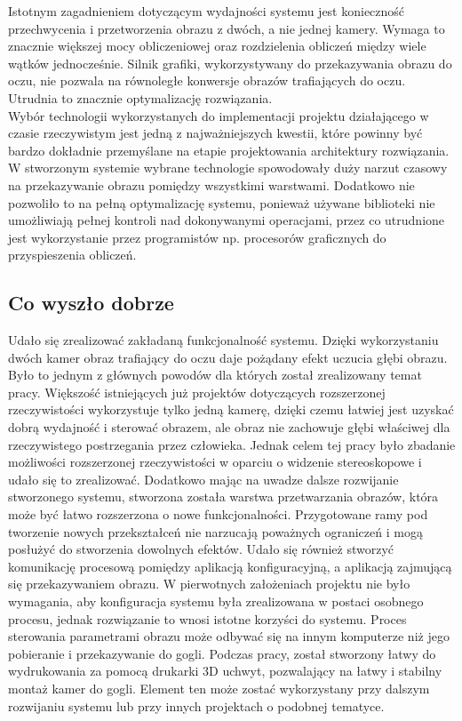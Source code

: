 \documentclass[a4paper,11pt,twoside]{report}
\theoremstyle{definition}
\begin{document}
Istotnym zagadnieniem dotyczącym wydajności systemu jest konieczność przechwycenia i przetworzenia obrazu z dwóch, a nie jednej kamery. Wymaga to znacznie większej mocy obliczeniowej oraz rozdzielenia obliczeń między wiele wątków jednocześnie. Silnik grafiki, wykorzystywany do przekazywania obrazu do oczu, nie pozwala na równoległe konwersje obrazów trafiających do oczu. Utrudnia to znacznie optymalizację rozwiązania. \\
Wybór technologii wykorzystanych do implementacji projektu działającego w czasie rzeczywistym jest jedną z najważniejszych kwestii, które powinny być bardzo dokładnie przemyślane na etapie projektowania architektury rozwiązania. W stworzonym systemie wybrane technologie spowodowały duży narzut czasowy na przekazywanie obrazu pomiędzy wszystkimi warstwami. Dodatkowo nie pozwoliło to na pełną optymalizację systemu, ponieważ używane biblioteki nie umożliwiają pełnej kontroli nad dokonywanymi operacjami, przez co utrudnione jest wykorzystanie przez programistów np. procesorów graficznych do przyspieszenia obliczeń.

\subsection{Co wyszło dobrze}

Udało się zrealizować zakładaną funkcjonalność systemu. Dzięki wykorzystaniu dwóch kamer obraz trafiający do oczu daje pożądany efekt uczucia głębi obrazu. Było to jednym z głównych powodów dla których został zrealizowany temat pracy. Większość istniejących już projektów dotyczących rozszerzonej rzeczywistości wykorzystuje tylko jedną kamerę, dzięki czemu łatwiej jest uzyskać dobrą wydajność i sterować obrazem, ale obraz nie zachowuje głębi właściwej dla rzeczywistego postrzegania przez człowieka. Jednak celem tej pracy było zbadanie możliwości rozszerzonej rzeczywistości w oparciu o widzenie stereoskopowe i udało się to zrealizować. Dodatkowo mając na uwadze dalsze rozwijanie stworzonego systemu, stworzona została warstwa przetwarzania obrazów, która może być łatwo rozszerzona o nowe funkcjonalności. Przygotowane ramy pod tworzenie nowych przekształceń nie narzucają poważnych ograniczeń i mogą posłużyć do stworzenia dowolnych efektów. Udało się również stworzyć komunikację procesową pomiędzy aplikacją konfiguracyjną, a aplikacją zajmującą się przekazywaniem obrazu. W pierwotnych założeniach projektu nie było wymagania, aby konfiguracja systemu była zrealizowana w postaci osobnego procesu, jednak rozwiązanie to wnosi istotne korzyści do systemu. Proces sterowania parametrami obrazu może odbywać się na innym komputerze niż jego pobieranie i przekazywanie do gogli. Podczas pracy, został stworzony łatwy do wydrukowania za pomocą drukarki 3D uchwyt, pozwalający na łatwy i stabilny montaż kamer do gogli. Element ten może zostać wykorzystany przy dalszym rozwijaniu systemu lub przy innych projektach o podobnej tematyce.
\end{document}
